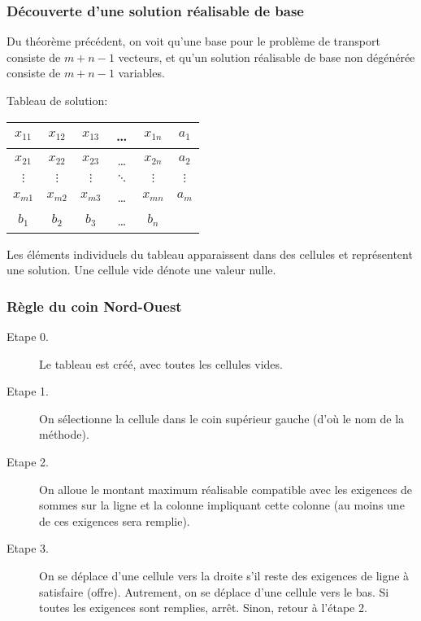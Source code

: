 \documentclass[usepdftitle=false]{beamer}
\begin{document}
\begin{frame}
\frametitle{Découverte d'une solution réalisable de base}

Du théorème précédent, on voit qu'une base pour le problème de transport consiste de $m+n-1$ vecteurs, et qu'un solution réalisable de base non dégénérée consiste de $m+n-1$ variables.

\mbox{}

Tableau de solution:
\begin{center}
\begin{tabular}{|c|c|c|c|c|c|}
\hline
$x_{11}$ & $x_{12}$ & $x_{13}$ & \ldots & $x_{1n}$ & $a_1$ \\
\hline
$x_{21}$ & $x_{22}$ & $x_{23}$ & \ldots & $x_{2n}$ & $a_2$ \\
\hline
$\vdots$ & $\vdots$ & $\vdots$ & $\ddots$ & $\vdots$ & $\vdots$ \\
\hline
$x_{m1}$ & $x_{m2}$ & $x_{m3}$ & \ldots & $x_{mn}$ & $a_m$ \\
\hline
$b_1$ & $b_2$ & $b_3$ & \ldots & $b_n$ & \\
\hline
\end{tabular}
\end{center}

\mbox{}

Les éléments individuels du tableau apparaissent dans des cellules et représentent une solution. Une cellule vide dénote une valeur nulle.

\end{frame}

\begin{frame}
\frametitle{Règle du coin Nord-Ouest}

\begin{description}
\item[Etape 0.]
Le tableau est créé, avec toutes les cellules vides.
\item[Etape 1.]
On sélectionne la cellule dans le coin supérieur gauche (d'où le nom de la méthode).
\item[Etape 2.]
On alloue le montant maximum réalisable compatible avec les exigences de sommes sur la ligne et la colonne impliquant cette colonne (au moins une de ces exigences sera remplie).
\item[Etape 3.]
On se déplace d'une cellule vers la droite s'il reste des exigences de ligne à satisfaire (offre). Autrement, on se déplace d'une cellule vers le bas. Si toutes les exigences sont remplies, arrêt. Sinon, retour à l'étape 2.
\end{description}

\end{frame}
\end{document}
